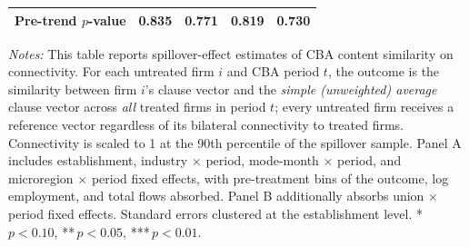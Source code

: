 \begin{table}[H]
\begin{tabular}{lcccc}
Pre-trend $p$-value & 0.835 & 0.771 & 0.819 & 0.730 \\
\hline\hline
\end{tabular}
\begin{minipage}{\linewidth}
\smallskip
\scriptsize\textit{Notes:} This table reports spillover-effect estimates of CBA content similarity on connectivity. For each untreated firm $i$ and CBA period $t$, the outcome is the similarity between firm $i$'s clause vector and the \emph{simple (unweighted) average} clause vector across \emph{all} treated firms in period $t$; every untreated firm receives a reference vector regardless of its bilateral connectivity to treated firms. Connectivity is scaled to 1 at the 90th percentile of the spillover sample. Panel A includes establishment, industry $\times$ period, mode-month $\times$ period, and microregion $\times$ period fixed effects, with pre-treatment bins of the outcome, log employment, and total flows absorbed. Panel B additionally absorbs union $\times$ period fixed effects. Standard errors clustered at the establishment level. *\,$p<0.10$, **\,$p<0.05$, ***\,$p<0.01$.
\end{minipage}
\end{table}
